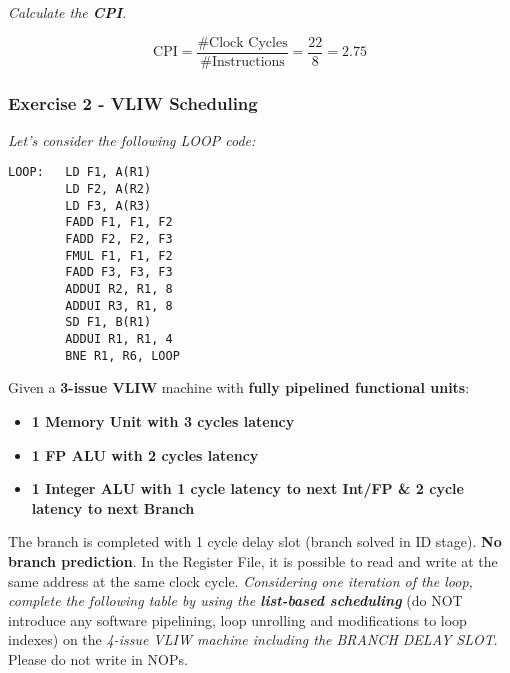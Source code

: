 \emph{Calculate the \textbf{CPI}.}

\highspace
\answer
\begin{equation*}
    \text{CPI} = \dfrac{\text{\# Clock Cycles}}{\text{\# Instructions}} = \dfrac{22}{8} = 2.75
\end{equation*}

\newpage

\subsubsection*{Exercise 2 - VLIW Scheduling}

\emph{Let's consider the following LOOP code:}
\begin{lstlisting}
LOOP:   LD F1, A(R1)
        LD F2, A(R2)
        LD F3, A(R3)
        FADD F1, F1, F2
        FADD F2, F2, F3
        FMUL F1, F1, F2
        FADD F3, F3, F3
        ADDUI R2, R1, 8
        ADDUI R3, R1, 8
        SD F1, B(R1)
        ADDUI R1, R1, 4
        BNE R1, R6, LOOP\end{lstlisting}
Given a \textbf{3-issue VLIW} machine with \textbf{fully pipelined functional units}:
\begin{itemize}
    \item \textbf{1 Memory Unit with 3 cycles latency}
    \item \textbf{1 FP ALU with 2 cycles latency}
    \item \textbf{1 Integer ALU with 1 cycle latency to next Int/FP \& 2 cycle latency to next Branch}
\end{itemize}
The branch is completed with 1 cycle delay slot (branch solved in ID stage). \textbf{No branch prediction}. In the Register File, it is possible to read and write at the same address at the same clock cycle. \emph{Considering one iteration of the loop, complete the following table by using the \textbf{list-based scheduling}} (do NOT introduce any software pipelining, loop unrolling and modifications to loop indexes) on the \emph{4-issue VLIW machine including the BRANCH DELAY SLOT}. Please do not write in NOPs.

\highspace
\answer

